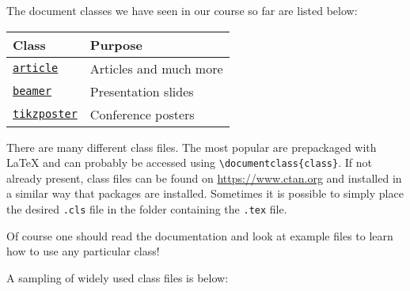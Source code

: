 \documentclass{paper}
\begin{document}
The document classes we have seen in our course so far are listed below:

\begin{center}
\begin{tabular}{l l}
\toprule 

Class & Purpose \\

\midrule

\href{https://www.ctan.org/pkg/article}{\texttt{article}}
& Articles and much more \\

\href{https://www.ctan.org/tex-archive/macros/latex/contrib/beamer}{\texttt{beamer}}
& Presentation slides \\

\href{https://www.ctan.org/pkg/tikzposter}{\texttt{tikzposter}}
& Conference posters \\

\bottomrule 
\end{tabular}
\end{center}

There are many different class files.  The most popular are prepackaged with \LaTeX{} and
can probably be accessed using \verb~\documentclass{class}~.  If not already present, class
files can be found on \url{https://www.ctan.org} and installed in a similar way that packages
are installed.  Sometimes it is possible to simply place the desired \verb~.cls~ file in
the folder containing the \verb~.tex~ file. 

Of course one should read the documentation and look at example files to learn
how to use any particular class! 

A sampling of widely used class files is below: 
\end{document}

